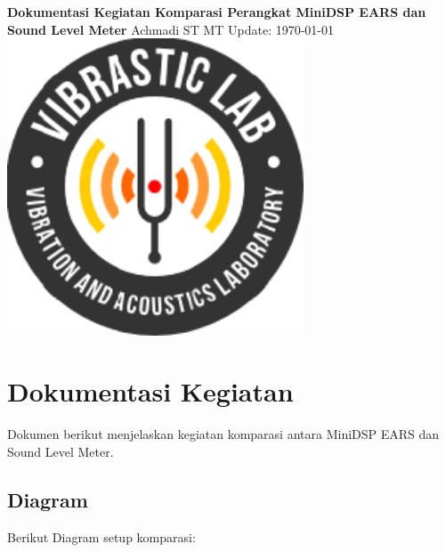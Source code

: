 \documentclass[12pt]{book}
\date{}
\begin{document}
	\frontmatter
	\begin{titlepage}
		\centering
		{\LARGE \bf Dokumentasi Kegiatan Komparasi Perangkat MiniDSP EARS dan Sound Level Meter}
		\vfill
		{\Large Achmadi ST MT}
		\vfill
		Update: {\today}
		\vfill
		\includegraphics[width=250pt]{images/logo/logoviblab}
		\vfill
		\vfill
		\vfill
	\end{titlepage}


	\newpage
	\tableofcontents
	\listoffigures
	\listoftables


	\mainmatter
	\newpage

	\chapter{Dokumentasi Kegiatan}

	Dokumen berikut menjelaskan kegiatan komparasi antara MiniDSP EARS dan Sound Level Meter.

	\section{Diagram}

	Berikut Diagram setup komparasi:
\end{document}
